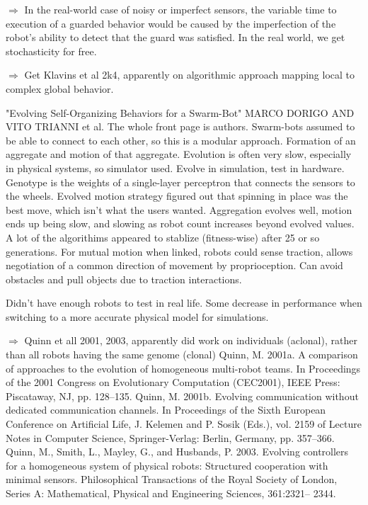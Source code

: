 \documentclass[]{article}
\begin{document}
$\Rightarrow$ In the real-world case of noisy or imperfect sensors, the variable time to execution of a guarded behavior would be caused by the imperfection of the robot's ability to detect that the guard was satisfied. In the real world, we get stochasticity for free. 

$\Rightarrow$ Get Klavins et al 2k4, apparently on algorithmic approach mapping local to complex global behavior.  

"Evolving Self-Organizing Behaviors for a Swarm-Bot" \cite{dorigo2004evolving} MARCO DORIGO AND VITO TRIANNI et al. The whole front page is authors. Swarm-bots assumed to be able to connect to each other, so this is a modular approach. Formation of an aggregate and motion of that aggregate. Evolution is often very slow, especially in physical systems, so simulator used. Evolve in simulation, test in hardware. Genotype is the weights of a single-layer perceptron that connects the sensors to the wheels. Evolved motion strategy figured out that spinning in place was the best move, which isn't what the users wanted. Aggregation evolves well, motion ends up being slow, and slowing as robot count increases beyond evolved values. A lot of the algorithims appeared to stablize (fitness-wise) after 25 or so generations. For mutual motion when linked, robots could sense traction, allows negotiation of a common direction of movement by proprioception. Can avoid obstacles and pull objects due to traction interactions. 

Didn't have enough robots to test in real life. Some decrease in performance when switching to a more accurate physical model for simulations. 

$\Rightarrow$ Quinn et all 2001, 2003, apparently did work on individuals (aclonal), rather than all robots having the same genome (clonal) Quinn, M. 2001a. A comparison of approaches to the evolution of homogeneous multi-robot teams. In Proceedings of the 2001 Congress on Evolutionary Computation (CEC2001), IEEE Press: Piscataway, NJ, pp. 128–135.
Quinn, M. 2001b. Evolving communication without dedicated communication channels. In Proceedings of the Sixth European Conference on Artificial Life, J. Kelemen and P. Sosik (Eds.), vol. 2159 of Lecture Notes in Computer Science, Springer-Verlag: Berlin, Germany, pp. 357–366.
Quinn, M., Smith, L., Mayley, G., and Husbands, P. 2003. Evolving controllers for a homogeneous system of physical robots: Structured cooperation with minimal sensors. Philosophical Transactions of the Royal Society of London, Series A: Mathematical, Physical and Engineering Sciences, 361:2321– 2344.
\end{document}
